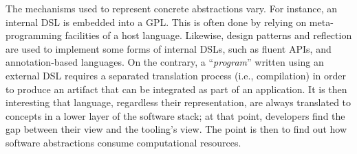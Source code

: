 The mechanisms used to represent concrete abstractions vary.
For instance, an internal DSL is embedded into a \gls{GPL}.
This is often done by relying on meta-programming facilities of a host language.
Likewise, design patterns and reflection are used to implement some forms of internal DSLs, such as fluent APIs, and annotation-based languages.
On the contrary, a ``\textit{program}'' written using an external DSL requires a separated translation process (i.e., compilation) in order to produce an artifact that can be integrated as part of an application.
It is then interesting that language, regardless their representation, are always translated to concepts in a lower layer of the software stack; at that point, developers find the gap between their view and the tooling's view. 
The point is then to find out how software abstractions consume computational resources.



